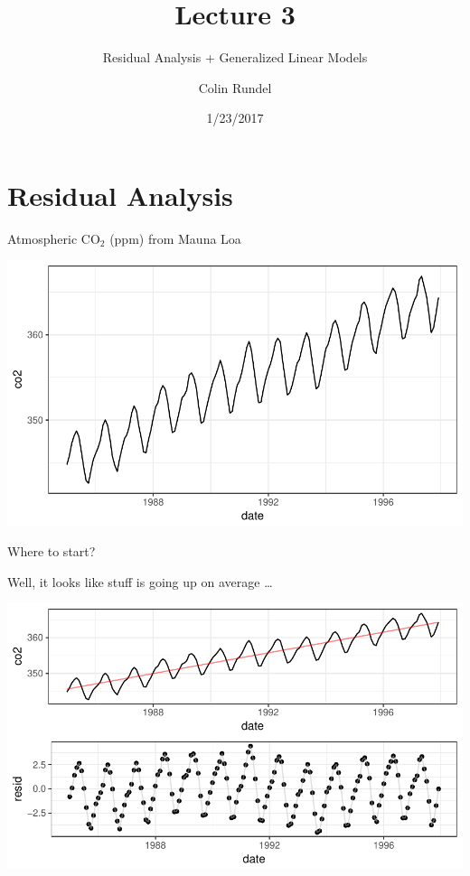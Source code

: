 \documentclass[11pt,ignorenonframetext,]{beamer}
\title{Lecture 3}
\subtitle{Residual Analysis + Generalized Linear Models}
\author{Colin Rundel}
\date{1/23/2017}
\begin{document}
\frame{\titlepage}

\section{Residual Analysis}\label{residual-analysis}

\begin{frame}{Atmospheric \(\text{CO}_2\) (ppm) from Mauna Loa}

\includegraphics{Lec3_files/figure-beamer/unnamed-chunk-1-1.pdf}

\end{frame}

\begin{frame}{Where to start?}

Well, it looks like stuff is going up on average \ldots{}

\pause

\includegraphics{Lec3_files/figure-beamer/unnamed-chunk-2-1.pdf}

\end{frame}
\end{document}

